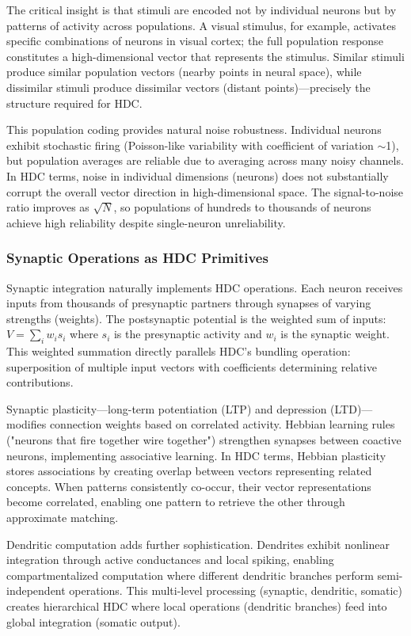 \documentclass[12pt]{article}
\begin{document}
The critical insight is that stimuli are encoded not by individual neurons but by patterns of activity across populations. A visual stimulus, for example, activates specific combinations of neurons in visual cortex; the full population response constitutes a high-dimensional vector that represents the stimulus. Similar stimuli produce similar population vectors (nearby points in neural space), while dissimilar stimuli produce dissimilar vectors (distant points)—precisely the structure required for HDC.

This population coding provides natural noise robustness. Individual neurons exhibit stochastic firing (Poisson-like variability with coefficient of variation $\sim$1), but population averages are reliable due to averaging across many noisy channels. In HDC terms, noise in individual dimensions (neurons) does not substantially corrupt the overall vector direction in high-dimensional space. The signal-to-noise ratio improves as $\sqrt{N}$, so populations of hundreds to thousands of neurons achieve high reliability despite single-neuron unreliability.

\subsubsection{Synaptic Operations as HDC Primitives}

Synaptic integration naturally implements HDC operations. Each neuron receives inputs from thousands of presynaptic partners through synapses of varying strengths (weights). The postsynaptic potential is the weighted sum of inputs: $V = \sum_i w_i s_i$ where $s_i$ is the presynaptic activity and $w_i$ is the synaptic weight. This weighted summation directly parallels HDC's bundling operation: superposition of multiple input vectors with coefficients determining relative contributions.

Synaptic plasticity—long-term potentiation (LTP) and depression (LTD)—modifies connection weights based on correlated activity. Hebbian learning rules ("neurons that fire together wire together") strengthen synapses between coactive neurons, implementing associative learning. In HDC terms, Hebbian plasticity stores associations by creating overlap between vectors representing related concepts. When patterns consistently co-occur, their vector representations become correlated, enabling one pattern to retrieve the other through approximate matching.

Dendritic computation adds further sophistication. Dendrites exhibit nonlinear integration through active conductances and local spiking, enabling compartmentalized computation where different dendritic branches perform semi-independent operations. This multi-level processing (synaptic, dendritic, somatic) creates hierarchical HDC where local operations (dendritic branches) feed into global integration (somatic output).
\end{document}
